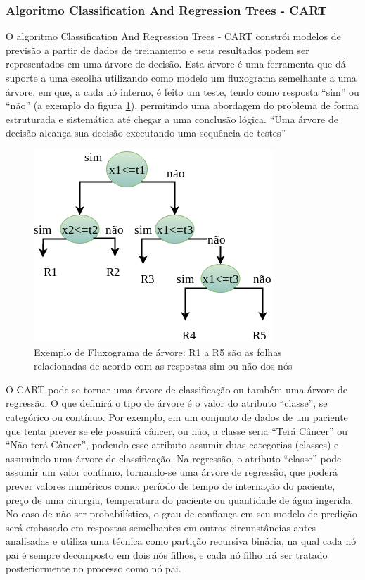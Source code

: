 \subsubsection{Algoritmo Classification And Regression Trees  - CART}\label{cap:refTeor:sssec:cart}


O algoritmo Classification And Regression Trees - CART constrói modelos de previsão a partir de dados de treinamento e seus resultados podem ser representados em uma árvore de decisão. Esta árvore  é uma ferramenta que dá suporte a uma escolha utilizando como modelo um fluxograma semelhante a uma árvore, em que, a cada nó interno, é feito um teste, tendo como resposta “sim” ou “não” (a exemplo da figura \ref{fig:fluxogramaarvore}), permitindo uma abordagem do problema de forma estruturada e sistemática até chegar a uma conclusão lógica. ``Uma árvore de decisão alcança sua decisão executando uma sequência de testes'' \cite[p. 811]{RusselStuart.Norvig2013}

 \begin{figure}[h!]
    \centering
      \includegraphics[scale=0.5]{figs/arvoredecisao_nos.png}
      \caption{Exemplo de Fluxograma de árvore: R1 a R5 são as folhas relacionadas de acordo com as respostas sim ou não dos nós} \label{fig:fluxogramaarvore}
\end{figure}

O CART pode se tornar uma árvore de classificação ou também uma árvore de regressão. O que definirá o tipo de árvore é o valor do atributo “classe”, se categórico ou contínuo. Por exemplo, em um conjunto de dados de um paciente que tenta prever se  ele possuirá câncer, ou não, a classe seria ``Terá Câncer'' ou ``Não terá Câncer'', podendo esse atributo assumir duas categorias (classes) e assumindo uma árvore de classificação. Na regressão, o atributo ``classe'' pode assumir um valor contínuo, tornando-se uma árvore de regressão, que poderá prever valores numéricos como: período de tempo de internação do paciente, preço de uma cirurgia, temperatura do paciente ou quantidade de água ingerida. No caso de não ser probabilístico, o grau de confiança em seu modelo de predição será embasado em respostas semelhantes em outras circunstâncias antes analisadas e utiliza uma técnica como partição recursiva binária, na qual cada nó pai é sempre decomposto em dois nós filhos, e cada nó filho irá ser tratado posteriormente no processo como nó pai. 

